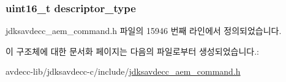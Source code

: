 \subsubsection[{\texorpdfstring{descriptor\+\_\+type}{descriptor_type}}]{\setlength{\rightskip}{0pt plus 5cm}uint16\+\_\+t descriptor\+\_\+type}\hypertarget{structjdksavdecc__aem__command__set__clock__source__response_ab7c32b6c7131c13d4ea3b7ee2f09b78d}{}\label{structjdksavdecc__aem__command__set__clock__source__response_ab7c32b6c7131c13d4ea3b7ee2f09b78d}


jdksavdecc\+\_\+aem\+\_\+command.\+h 파일의 15946 번째 라인에서 정의되었습니다.



이 구조체에 대한 문서화 페이지는 다음의 파일로부터 생성되었습니다.\+:\begin{DoxyCompactItemize}
\item 
avdecc-\/lib/jdksavdecc-\/c/include/\hyperlink{jdksavdecc__aem__command_8h}{jdksavdecc\+\_\+aem\+\_\+command.\+h}\end{DoxyCompactItemize}
